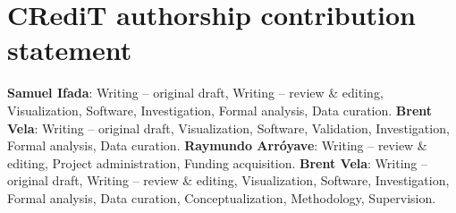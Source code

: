 \section*{CRediT authorship contribution statement}
\textbf{Samuel Ifada}: Writing – original draft, Writing – review \& editing, Visualization, Software, Investigation, Formal analysis, Data curation. \textbf{Brent Vela}: Writing – original draft, Visualization, Software, Validation, Investigation, Formal analysis, Data curation. \textbf{Raymundo Arróyave}: Writing – review \& editing, Project administration, Funding acquisition. \textbf{Brent Vela}: Writing – original draft, Writing – review \& editing, Visualization, Software, Investigation, Formal analysis, Data curation, Conceptualization, Methodology, Supervision.

